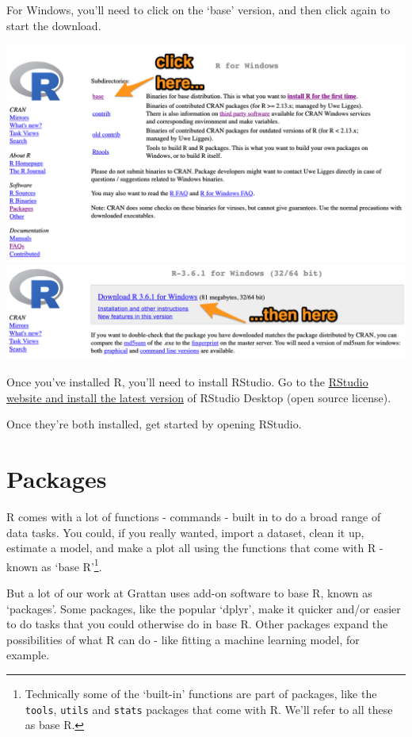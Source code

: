 \documentclass[]{book}
\let\rmarkdownfootnote\footnote%
\def\footnote{\protect\rmarkdownfootnote}
\begin{document}
For Windows, you'll need to click on the `base' version, and then click again to start the download.

\includegraphics[width=15.69in]{atlas/r_cran_windows_1}
\includegraphics[width=15.67in]{atlas/r_cran_windows_2}

Once you've installed R, you'll need to install RStudio. Go to the \href{https://www.rstudio.com/products/rstudio/download/\#download}{RStudio website and install the latest version} of RStudio Desktop (open source license).

Once they're both installed, get started by opening RStudio.

\hypertarget{packages}{%
\section{Packages}\label{packages}}

R comes with a lot of functions - commands - built in to do a broad range of data tasks. You could, if you really wanted, import a dataset, clean it up, estimate a model, and make a plot all using the functions that come with R - known as `base R'\footnote{Technically some of the `built-in' functions are part of packages, like the \texttt{tools}, \texttt{utils} and \texttt{stats} packages that come with R. We'll refer to all these as base R.}.

But a lot of our work at Grattan uses add-on software to base R, known as `packages'. Some packages, like the popular `dplyr', make it quicker and/or easier to do tasks that you could otherwise do in base R. Other packages expand the possibilities of what R can do - like fitting a machine learning model, for example.
\end{document}
